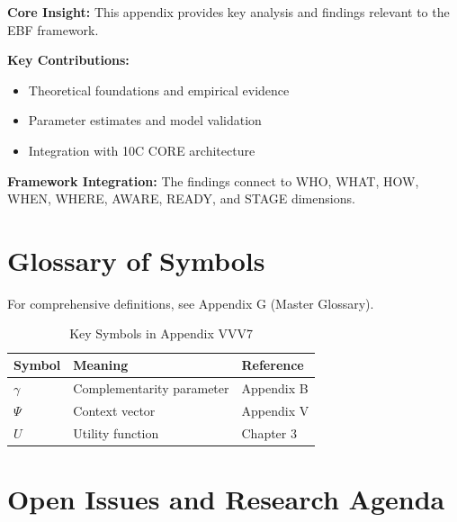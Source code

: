 \begin{tcolorbox}[colback=gray!5!white, colframe=gray!75!black,
    title=Appendix VVV7 Summary]

\textbf{Core Insight:}
This appendix provides key analysis and findings relevant to the EBF framework.

\textbf{Key Contributions:}
\begin{itemize}[nosep]
    \item Theoretical foundations and empirical evidence
    \item Parameter estimates and model validation
    \item Integration with 10C CORE architecture
\end{itemize}

\textbf{Framework Integration:}
The findings connect to WHO, WHAT, HOW, WHEN, WHERE, AWARE, READY, and STAGE dimensions.

\end{tcolorbox}

\section{Glossary of Symbols}
\label{sec:vvv7-glossary}

For comprehensive definitions, see Appendix G (Master Glossary).

\begin{table}[htbp]
\centering
\caption{Key Symbols in Appendix VVV7}
\begin{tabular}{lll}
\toprule
\textbf{Symbol} & \textbf{Meaning} & \textbf{Reference} \\
\midrule
$\gamma$ & Complementarity parameter & Appendix B \\
$\Psi$ & Context vector & Appendix V \\
$U$ & Utility function & Chapter 3 \\
\bottomrule
\end{tabular}
\end{table}



\section{Open Issues and Research Agenda}
\label{sec:x-open}

